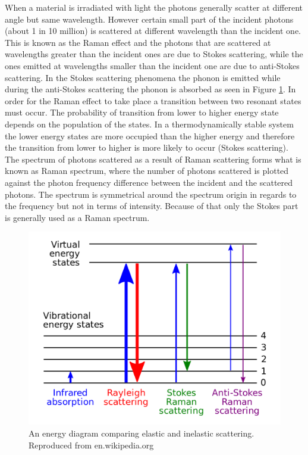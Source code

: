 When a material is irradiated with light the photons generally scatter at different angle but same wavelength. However certain small part of the incident photons (about 1 in 10 million) is scattered at different wavelength than the incident one. This is known as the Raman effect and the photons that are scattered at wavelengths greater than the incident ones are due to Stokes scattering, while the ones emitted at wavelengths smaller than the incident one are due to anti-Stokes scattering. In the Stokes scattering phenomena the phonon is emitted while during the anti-Stokes scattering the phonon is absorbed as seen in Figure \ref{fig:MethodologyRamanEnergyLevels}. In order for the Raman effect to take place a transition between two resonant states must occur. The probability of transition from lower to higher energy state depends on the population of the states. In a thermodynamically stable system the lower energy states are more occupied than the higher energy and therefore the transition from lower to higher is more likely to occur (Stokes scattering). The spectrum of photons scattered as a result of Raman scattering forms what is known as Raman spectrum, where the number of photons scattered is plotted against the photon frequency difference between the incident and the scattered photons. The spectrum is symmetrical around the spectrum origin in regards to the frequency but not in terms of intensity. Because of that only the Stokes part is generally used as a Raman spectrum.

\begin{figure}[!h]
	\begin{center}
		\includegraphics[scale=0.3]{Methodology/RamanEnergyLevels.png}
		\caption{An energy diagram comparing elastic and inelastic scattering. Reproduced from en.wikipedia.org}
		\label{fig:MethodologyRamanEnergyLevels}
	\end{center}
\end{figure}


